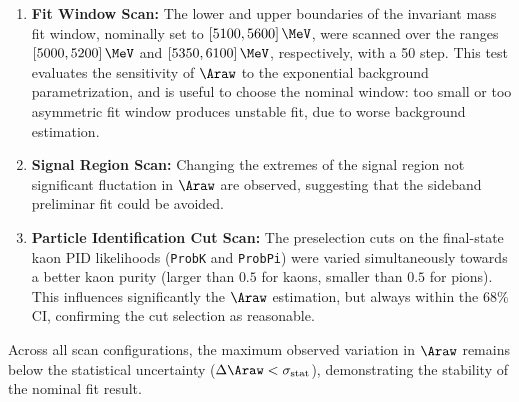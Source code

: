 \begin{enumerate}[leftmargin=*]
    \item \textbf{Fit Window Scan:} The lower and upper boundaries of the invariant mass fit window, nominally set to $[5100, 5600]\,\MeV$, were scanned over the ranges $[5000, 5200]\,\MeV$ and $[5350, 6100]\,\MeV$, respectively, with a 50 \MeV step. This test evaluates the sensitivity of $\Araw$ to the exponential background parametrization, and is useful to choose the nominal window: too small or too asymmetric fit window produces unstable fit, due to worse background estimation.

    \item \textbf{Signal Region Scan:} Changing the extremes of the signal region not significant fluctation in $\Araw$ are observed, suggesting that the sideband preliminar fit could be avoided.

    \item \textbf{Particle Identification Cut Scan:} The preselection cuts on the final-state kaon PID likelihoods (\texttt{ProbK} and \texttt{ProbPi}) were varied simultaneously towards a better kaon purity (larger than $0.5$ for kaons, smaller than $0.5$ for pions). This influences significantly the $\Araw$ estimation, but always within the $68\%$ CI, confirming the cut selection as reasonable.
\end{enumerate}

Across all scan configurations, the maximum observed variation in $\Araw$ remains below the statistical uncertainty ($\Delta \Araw < \sigma_{\mathrm{stat}}$), demonstrating the stability of the nominal fit result.
